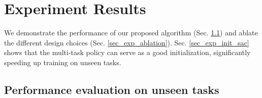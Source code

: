 \section{Experiment Results}\label{sec_exp}

\newcommand{\mujocobaselinefigsize}{0.143}

We demonstrate the performance of our proposed algorithm (Sec. \ref{sec_exp_eval}) and ablate the different design choices (Sec. \ref{sec_exp_ablation}). Sec. \ref{sec_exp_init_sac} shows that the multi-task policy can serve as a good initialization, significantly speeding up training on unseen tasks. 

\subsection{Performance evaluation on unseen tasks}\label{sec_exp_eval}


